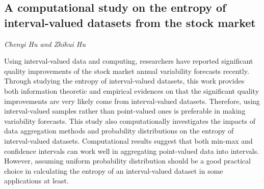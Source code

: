 \documentclass[../booklet.tex]{subfiles}
\begin{document}
\subsection[A computational study on the entropy of interval-valued datasets from the stock market. {\it Chenyi Hu and Zhihui Hu}]{A computational study on the entropy of interval-valued datasets from the stock market}
 

\begin{center}
  {\it Chenyi Hu and Zhihui Hu}
\end{center}



Using interval-valued data and computing, researchers have reported significant quality improvements of the stock market annual variability forecasts recently. Through studying the entropy of interval-valued datasets, this work provides both information theoretic and empirical evidences on that the significant quality improvements are very likely come from interval-valued datasets.  
Therefore, using interval-valued samples rather than point-valued ones is preferable in making variability forecasts. 
This study also computationally investigates the impacts of data aggregation methods and probability distributions on the entropy of interval-valued datasets. Computational results suggest that both min-max and confidence intervals can work well in aggregating point-valued data into intervals. However, assuming uniform probability distribution should be a good practical choice in calculating the entropy of an interval-valued dataset in some applications at least. %

\end{document}

